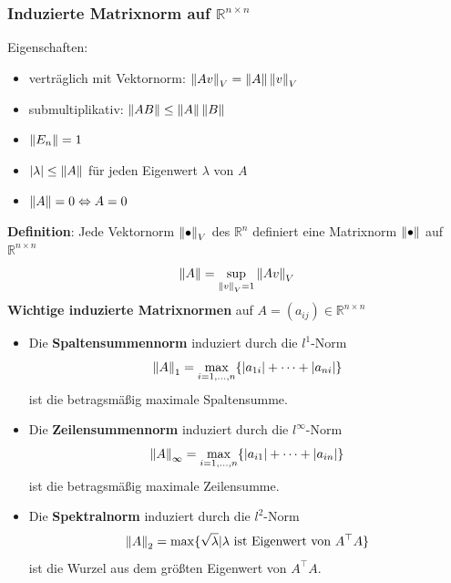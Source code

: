 \documentclass[6pt,a4paper]{scrartcl}
\newcommand{\abs}[1]{\ensuremath{\left\vert#1\right\vert}}
\newcommand{\norm}[2][\relax]{\ifx#1\relax \ensuremath{\left\Vert#2\right\Vert}\else \ensuremath{\left\Vert#2\right\Vert_{#1}}\fi}
\begin{document}
\begin{multicols*}{4}
\subsubsection{Induzierte Matrixnorm auf $\mathbb R^{n\times n}$}
Eigenschaften:
\begin{itemize}\itemsep0pt
\item verträglich mit Vektornorm: $\norm{Av}_V=\norm{A}\norm{v}_V$
\item submultiplikativ: $\norm{AB}\le\norm{A}\norm{B}$
\item $\norm{E_n}=1$
\item $\abs{\lambda}\le\norm{A}$ für jeden Eigenwert $\lambda$ von $A$
\item $\norm{A}=0 \Leftrightarrow A=0$
\end{itemize}
\textbf{Definition}: Jede Vektornorm $\norm{\bullet}_V$ des $\mathbb{R}^n$ definiert eine Matrixnorm $\norm{\bullet}$ auf $\mathbb{R}^{n\times n}$
\begin{equation*}
\norm{A}= \sup_{\norm{v}_V=1}\norm{Av}_V
\end{equation*}
\textbf{Wichtige induzierte Matrixnormen} auf $A=(a_{ij})\in \mathbb R^{n\times n}$
\begin{itemize}\itemsep0pt
\item Die \textbf{Spaltensummennorm} induziert durch die $l^1$-Norm
\begin{equation*}
	\norm{A}_1 = \max_{i=1, \ldots ,n} \{\abs{a_{1i}}+\dots +\abs{a_{ni}} \}
\end{equation*}
ist die betragsmäßig maximale Spaltensumme.
\item Die \textbf{Zeilensummennorm} induziert durch die $l^\infty$-Norm
\begin{equation*}
\norm{A}_\infty = \max_{i=1, \ldots ,n} \{\abs{a_{i1}}+\dots +\abs{a_{in}} \}
\end{equation*}
ist die betragsmäßig maximale Zeilensumme.
\item Die \textbf{Spektralnorm} induziert durch die $l^2$-Norm
\begin{equation*}
\norm{A}_2 = \max\{\sqrt{\lambda}|\lambda\text{ ist Eigenwert von }A^\top A\}
\end{equation*}
ist die Wurzel aus dem größten Eigenwert von $A^\top A$.
\end{itemize}


\end{multicols*}
\end{document}
